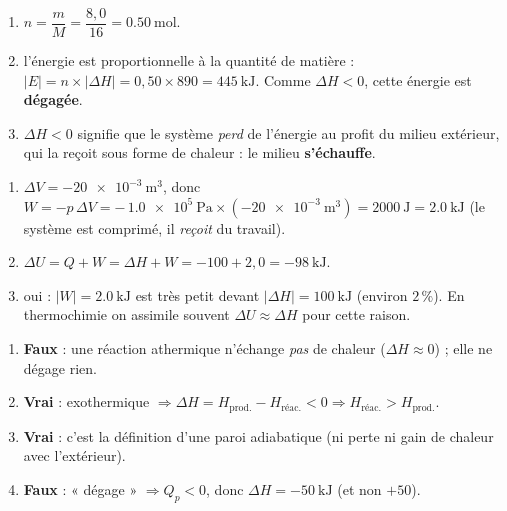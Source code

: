 \documentclass[11pt,a4paper]{article}
\begin{document}
\begin{corrige}
\begin{enumerate}[label=\alph*)]
  \item $n = \dfrac{m}{M} = \dfrac{8{,}0}{16} = \qty{0.50}{\mol}$.
  \item l'énergie est proportionnelle à la quantité de matière : $|E| = n\times|\Delta H| = 0{,}50\times 890 = \qty{445}{\kilo\joule}$. Comme $\Delta H<0$, cette énergie est \textbf{dégagée}.
  \item $\Delta H<0$ signifie que le système \emph{perd} de l'énergie au profit du milieu extérieur, qui la reçoit sous forme de chaleur : le milieu \textbf{s'échauffe}.
\end{enumerate}
\end{corrige}

\begin{corrige}
\begin{enumerate}[label=\alph*)]
  \item $\Delta V=\qty{-20e-3}{\cubic\metre}$, donc $W=-p\,\Delta V = -\,\qty{1.0e5}{\pascal}\times(\qty{-20e-3}{\cubic\metre}) = \qty{+2000}{\joule}=\qty{+2.0}{\kilo\joule}$ (le système est comprimé, il \emph{reçoit} du travail).
  \item $\Delta U = Q + W = \Delta H + W = -100 + 2{,}0 = \qty{-98}{\kilo\joule}$.
  \item oui : $|W|=\qty{2.0}{\kilo\joule}$ est très petit devant $|\Delta H|=\qty{100}{\kilo\joule}$ (environ $2\,\%$). En thermochimie on assimile souvent $\Delta U\approx\Delta H$ pour cette raison.
\end{enumerate}
\end{corrige}

\begin{corrige}
\begin{enumerate}[label=\alph*)]
  \item \textbf{Faux} : une réaction athermique n'échange \emph{pas} de chaleur ($\Delta H\approx 0$) ; elle ne dégage rien.
  \item \textbf{Vrai} : exothermique $\Rightarrow \Delta H = H_{\text{prod.}}-H_{\text{réac.}}<0 \Rightarrow H_{\text{réac.}}>H_{\text{prod.}}$.
  \item \textbf{Vrai} : c'est la définition d'une paroi adiabatique (ni perte ni gain de chaleur avec l'extérieur).
  \item \textbf{Faux} : « dégage » $\Rightarrow Q_p<0$, donc $\Delta H = \qty{-50}{\kilo\joule}$ (et non $+50$).
\end{enumerate}
\end{corrige}
\end{document}
